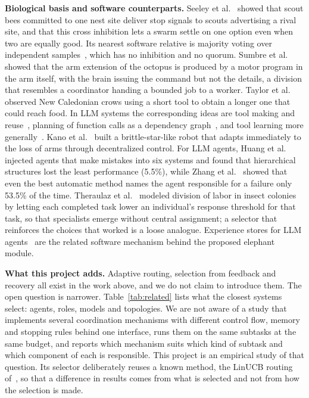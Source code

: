\documentclass[11pt,a4paper]{article}
\newcommand{\runin}[1]{\textbf{#1}\quad}
\begin{document}
\runin{Biological basis and software counterparts.}
Seeley et al.~\cite{seeley2012} showed that scout bees committed to one nest site deliver stop signals to
scouts advertising a rival site, and that this cross inhibition lets a swarm settle on one option even when
two are equally good. Its nearest software relative is majority voting over independent
samples~\cite{wang2023selfconsistency}, which has no inhibition and no quorum. Sumbre et
al.~\cite{sumbre2001} showed that the arm extension of the octopus is produced by a motor program in the
arm itself, with the brain issuing the command but not the details, a division that resembles a coordinator
handing a bounded job to a worker. Taylor et al.~\cite{taylor2007} observed New Caledonian crows using a
short tool to obtain a longer one that could reach food. In LLM systems the corresponding ideas are tool
making and reuse~\cite{cai2024latm}, planning of function calls as a dependency graph~\cite{kim2024llmcompiler},
and tool learning more generally~\cite{qin2025tool}. Kano et al.~\cite{kano2017} built a brittle-star-like
robot that adapts immediately to the loss of arms through decentralized control. For LLM agents, Huang et
al.~\cite{huang2025resilience} injected agents that make mistakes into six systems and found that
hierarchical structures lost the least performance (5.5\%), while Zhang et al.~\cite{zhang2025whowhen}
showed that even the best automatic method names the agent responsible for a failure only 53.5\% of the
time. Theraulaz et al.~\cite{theraulaz1998} modeled division of labor in insect colonies by letting each
completed task lower an individual's response threshold for that task, so that specialists emerge without
central assignment; a selector that reinforces the choices that worked is a loose analogue. Experience
stores for LLM agents~\cite{zhao2024expel,zhang2025memory} are the related software mechanism behind the
proposed elephant module.

\runin{What this project adds.}
Adaptive routing, selection from feedback and recovery all exist in the work above, and we do not claim to
introduce them. The open question is narrower. Table~\ref{tab:related} lists what the closest systems
select: agents, roles, models and topologies. We are not aware of a study that implements several
coordination mechanisms with different control flow, memory and stopping rules behind one interface, runs
them on the same subtasks at the same budget, and reports which mechanism suits which kind of subtask and
which component of each is responsible. This project is an empirical study of that question. Its selector
deliberately reuses a known method, the LinUCB routing of~\cite{guan2026symphony}, so that a difference in
results comes from what is selected and not from how the selection is made.
\end{document}

